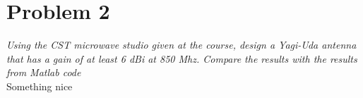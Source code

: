 \section{Problem 2}
\textit{ Using the CST microwave studio given at the course, design a Yagi-Uda antenna that has a gain of at least 6 dBi at 850 Mhz. Compare the results with the results from Matlab code }\\

Something nice